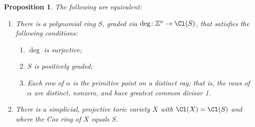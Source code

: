 \documentclass[11pt]{amsart}
\numberwithin{equation}{section}
\newtheorem{prop}[equation]{Proposition}
\theoremstyle{definition}
\theoremstyle{remark}
\newcommand{\ZZ}{\mathbb Z}
\begin{document}
\begin{prop}
The following are equivalent:
\begin{enumerate}
 \item There is a polynomial ring $S$, graded via $\deg\colon \ZZ^n\to \Cl(S)$, that satisfies the following conditions:
    \begin{enumerate}
        \item $\deg$ is surjective;
        \item $S$ is positively graded;
        \item Each row of $\alpha$ is the primitive point on a distinct ray; that is, the rows of
        $\alpha$ are distinct, nonzero, and have greatest common divisor 1.
    \end{enumerate}
    \item There is a simplicial, projective toric variety $X$ with $\Cl(X) = \Cl(S)$ and where the Cox ring of $X$ equals $S$.
\end{enumerate}
\end{prop}
\end{document}
